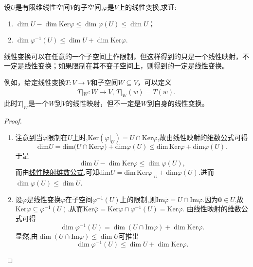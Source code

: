 \documentclass[../../main.tex]{subfiles}
\begin{document}
\begin{proposition}\label{proposition:线性变换关于子空间的维数不等式}
设\(U\)是有限维线性空间\(V\)的子空间,\(\varphi\)是\(V\)上的线性变换,求证:
\begin{enumerate}[(1)]
\item \(\dim U-\dim\text{Ker}\varphi\leqslant \dim\varphi(U)\leqslant \dim U\)；

\item \(\dim\varphi^{-1}(U)\leqslant \dim U+\dim\text{Ker}\varphi\).
\end{enumerate}
\end{proposition}
\begin{note}
线性变换可以在任意的一个子空间上作限制，但这样得到的只是一个线性映射，不一定是线性变换；如果限制在其不变子空间上，则得到的一定是线性变换。

例如，给定线性变换$T:V\rightarrow V$和子空间$W\subseteq V$，可以定义
\begin{align*}
T|_W:W\rightarrow V,\,T|_W\left( w \right) =T\left( w \right).
\end{align*}
此时$T|_W$是一个$W$到$V$的线性映射，但不一定是$W$到自身的线性变换。
\end{note}
\begin{proof}
\begin{enumerate}[(1)]
\item 注意到当\(\varphi\)限制在\(U\)上时,\(\text{Ker}(\varphi|_U)=U\cap\text{Ker}\varphi\),故由线性映射的维数公式可得
\[
\mathrm{dim}U=\mathrm{dim(}U\cap \mathrm{Ker}\varphi )+\mathrm{dim}\varphi (U)\leqslant \mathrm{dim}\,\mathrm{Ker}\varphi +\mathrm{dim}\varphi (U).
\]
于是
\[
\dim U - \dim\text{Ker}\varphi\leqslant \dim\varphi(U),
\]
而由\hyperref[theorem:值域和核空间维数之和等于原像空间维数]{线性映射维数公式},可知$\mathrm{dim}U=\mathrm{dim}\,\mathrm{Ker}\varphi |_U+\mathrm{dim}\varphi (U)$.进而\(\dim\varphi(U)\leqslant \dim U\).

\item 设\(\overline{\varphi}\)是线性变换\(\varphi\)在子空间\(\varphi^{-1}(U)\)上的限制,则\(\text{Im}\overline{\varphi}=U\cap\text{Im}\varphi\).因为\(\boldsymbol{0}\in U\),故\(\text{Ker}\varphi\subseteq\varphi^{-1}(U)\).从而\(\text{Ker}\overline{\varphi}=\text{Ker}\varphi\cap\varphi^{-1}(U)=\text{Ker}\varphi\). 由线性映射的维数公式可得
\[
\dim\varphi^{-1}(U)=\dim(U\cap\text{Im}\varphi)+\dim\text{Ker}\varphi.
\]
显然,由\(\dim(U\cap\text{Im}\varphi)\leqslant \dim U\)可推出
\[
\dim\varphi^{-1}(U)\leqslant \dim U+\dim\text{Ker}\varphi. 
\]
\end{enumerate}
\end{proof}
\end{document}
